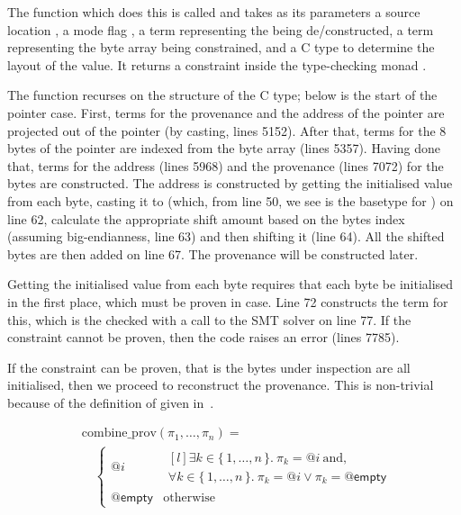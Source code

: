 The function which does this is called  and
takes as its parameters a source location , a mode flag
, a term representing the  being
de/constructed, a term representing the byte array  being
constrained, and a C type  to determine the layout of the
value. It returns a constraint  inside the type-checking
monad .


The function recurses on the structure of the C type; below is the start of the
pointer case. First, terms for the provenance and the address of the pointer
are projected out of the pointer (by casting, lines 51\textendash{}52). After
that, terms for the 8 bytes of the pointer are indexed from the byte array
(lines 53\textendash{}57). Having done that, terms for the address (lines
59\textendash{}68) and the provenance (lines 70\textendash{}72) for the bytes
are constructed. The address is constructed by getting the initialised value
from each byte, casting it to  (which, from line 50, we see is
the basetype for ) on line 62, calculate the appropriate
shift amount based on the bytes index (assuming big-endianness, line 63) and
then shifting it (line 64). All the shifted bytes are then added on line 67.
The provenance will be constructed later.


Getting the initialised value from each byte requires that each byte be
initialised in the first place, which must be proven in 
case. Line 72 constructs the term for this, which is the checked with a call to
the SMT solver on line 77. If the constraint cannot be proven, then the code
raises an error (lines 77\textendash{}85).


If the constraint can be proven, that is the bytes under inspection are all
initialised, then we proceed to reconstruct the provenance. This is non-trivial
because of the definition of  given
in~.

{\small%
\begin{align*}
    &\mathrm{combine\_prov}(\pi_1, \ldots, \pi_n) = \\
    &\quad
    \begin{cases}
        @i & { \begin{matrix*}[l]
                \exists k \in \{\, 1, \ldots, n \,\}.\ \pi_k = @i\ \text{and,} \\
                \forall k \in \{\, 1, \ldots, n \,\}.\ \pi_k = @i \vee \pi_k = \mathsf{@empty}
                \end{matrix*} } \\
        \mathsf{@empty} & \text{otherwise}
    \end{cases}
\end{align*}}

